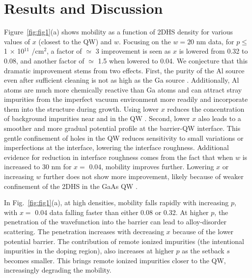 \documentclass[reprint,amsmath,amssymb,aps,prl,nobibnotes,superscriptaddress]{revtex4-1}
\begin{document}
 \section{Results and Discussion}

Figure~\ref{fig:fig1}(a) shows mobility as a function of 2DHS density for various values of $x$ (closest to the QW) and $w$. Focusing on the $w=20$ nm data, for $p\leq$ 1 $\times$ 10$^{11}$ /cm$^{2}$, a factor of $\simeq$ 3 improvement is seen as $x$ is lowered from 0.32 to 0.08, and another factor of $\simeq$ 1.5 when lowered to 0.04. We conjecture that this dramatic improvement stems from two effects. First, the purity of the Al source even after sufficient cleaning is not as high as the Ga source \cite{Chung2018, Chung2021elec}. Additionally, Al atoms are much more chemically reactive than Ga atoms and can attract stray impurities from the imperfect vacuum environment more readily and incorporate them into the structure during growth. Using lower $x$ reduces the concentration of background impurities near and in the QW \cite{Chung2018, Chung2021elec}. Second, lower $x$ also leads to a smoother and more gradual potential profile at the barrier-QW interface. This gentle confinement of holes in the QW reduces sensitivity to small variations or imperfections at the interface, lowering the interface roughness. Additional evidence for reduction in interface roughness comes from the fact that when $w$ is increased to 30 nm for $x=$ 0.04, mobility improves further. Lowering $x$ or increasing $w$ further does not show more improvement, likely because of weaker confinement of the 2DHS in the GaAs QW \cite{Supp}.

In Fig.~\ref{fig:fig1}(a), at high densities, mobility falls rapidly with increasing $p$, with $x=$ 0.04 data falling faster than either 0.08 or 0.32. At higher $p$, the penetration of the wavefunction into the barrier can lead to alloy-disorder scattering. The penetration increases with decreasing $x$ because of the lower potential barrier. The contribution of remote ionized impurities (the intentional impurities in the doping region), also increases at higher $p$ as the setback $s$ becomes smaller. This brings remote ionized impurities closer to the QW, increasingly degrading the mobility. 
\end{document}
